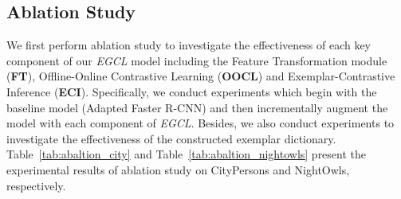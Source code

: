 \documentclass[journal]{IEEEtran}
\begin{document}
\subsection{Ablation Study} 
\label{sec:ablation}
We first perform ablation study to investigate the effectiveness of each key component of our \emph{EGCL} model including the Feature Transformation module (\textbf{FT}), Offline-Online Contrastive Learning (\textbf{OOCL}) and Exemplar-Contrastive Inference (\textbf{ECI}). Specifically, we conduct experiments which begin with the baseline model (Adapted Faster R-CNN) and then incrementally augment the model with each component of \emph{EGCL}. Besides, we also conduct experiments to investigate the effectiveness of the constructed exemplar dictionary. Table~\ref{tab:abaltion_city} and Table~\ref{tab:abaltion_nightowls} present the experimental results of ablation study on CityPersons and NightOwls, respectively. 

\begin{table}[!t]
\centering
\caption{Ablation study of our \emph{EGCL} model on CityPersons validation set in terms of  (lower is better). Baseline refers to Adapted Faster R-CNN. Note that the FT module is embedded before the RPN module in the Asterisked model (Baseline+FT) while other models mount the FT module after the RPN. For all results, lower is better.}
\renewcommand\arraystretch{2.8} 
\label{tab:abaltion_city}
\end{table}
\end{document}

